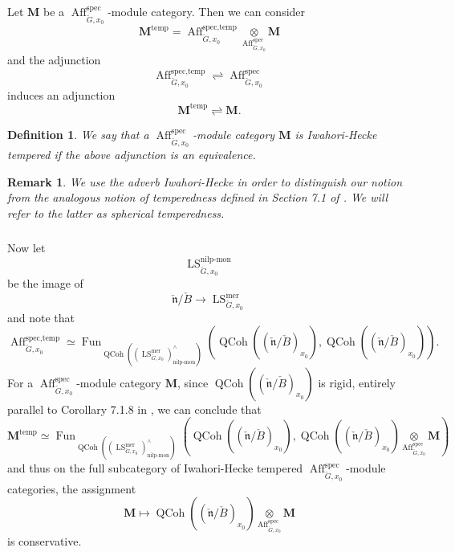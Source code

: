 \documentclass[10pt,a4paper]{amsart}
\newtheorem{defn}[subsubsection]{Definition}
\newtheorem{rem}[subsubsection]{Remark}
\newcommand{\on}[1]{\operatorname{#1}}
\newcommand{\QCoh}{\on{QCoh}}
\newcommand{\Gcheck}{\check{G}}
\newcommand{\ncheck}{\check{\mathfrak{n}}}
\newcommand{\Bcheck}{\check{B}}
\newcommand{\sssec}[1]{\subsubsection{}}
\begin{document}
\sssec{}
Let $\boldsymbol{M}$ be a $\on{Aff}_{\Gcheck, x_0}^{\on{spec}}$-module category. Then we can consider
$$
\boldsymbol{M}^{\on{temp}} = \on{Aff}_{\Gcheck, x_0}^{\on{spec, temp}} \underset{\on{Aff}_{\Gcheck, x_0}^{\on{spec}}}{\otimes} \boldsymbol{M}
$$
and the adjunction
$$
\on{Aff}_{\Gcheck, x_0}^{\on{spec, temp}} \rightleftharpoons \on{Aff}_{\Gcheck, x_0}^{\on{spec}}
$$
induces an adjunction
$$
\boldsymbol{M}^{\on{temp}} \rightleftharpoons \boldsymbol{M}.
$$

\begin{defn}
    We say that a $\on{Aff}_{\Gcheck, x_0}^{\on{spec}}$-module category $\boldsymbol{M}$ is \emph{Iwahori-Hecke tempered} if the above adjunction is an equivalence.
\end{defn}

\begin{rem}
    We use the adverb \emph{Iwahori-Hecke} in order to distinguish our notion from the analogous notion of temperedness defined in Section 7.1 of \cite{GLC2}. We will refer to the latter as \emph{spherical} temperedness.
\end{rem}

\sssec{}
Now let
$$
\on{LS}_{\Gcheck, x_0}^{\on{nilp-mon}}
$$
be the image of
$$
\ncheck/\Bcheck \to \on{LS}_{\Gcheck, x_0}^{\on{mer}}
$$
and note that
$$
\on{Aff}_{\Gcheck, x_0}^{\on{spec, temp}} \simeq \on{Fun}_{\QCoh((\on{LS}_{\Gcheck, x_0}^{\on{mer}})_{\on{nilp-mon}}^\wedge)}(\QCoh((\ncheck/\Bcheck)_{x_0}), \QCoh((\ncheck/\Bcheck)_{x_0})).
$$
For a $\on{Aff}_{\Gcheck, x_0}^{\on{spec}}$-module category $\boldsymbol{M}$, since $\QCoh((\ncheck/\Bcheck)_{x_0})$ is rigid, entirely parallel to Corollary 7.1.8 in \cite{GLC2}, we can conclude that
$$
\boldsymbol{M}^{\on{temp}} \simeq \on{Fun}_{\QCoh((\on{LS}_{\Gcheck, x_0}^{\on{mer}})_{\on{nilp-mon}}^\wedge)}(\QCoh((\ncheck/\Bcheck)_{x_0}), \QCoh((\ncheck/\Bcheck)_{x_0}) \underset{\on{Aff}_{\Gcheck, x_0}^{\on{spec}}}{\otimes} \boldsymbol{M})
$$
and thus on the full subcategory of Iwahori-Hecke tempered $\on{Aff}_{\Gcheck, x_0}^{\on{spec}}$-module categories, the assignment
$$
\boldsymbol{M} \mapsto \QCoh((\ncheck/\Bcheck)_{x_0}) \underset{\on{Aff}_{\Gcheck, x_0}^{\on{spec}}}{\otimes} \boldsymbol{M}
$$
is conservative.
\end{document}
